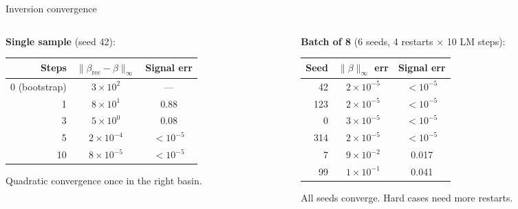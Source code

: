 \documentclass[aspectratio=169]{beamer}
\begin{document}
\begin{frame}{Inversion convergence}
  \begin{columns}[T]
    \begin{column}{0.52\textwidth}
      \textbf{Single sample} (seed 42):

      \smallskip

      \begin{tabular}{rcc}
        \toprule
        \textbf{Steps} & $\|\beta_{\text{rec}} - \beta\|_\infty$ & Signal err \\
        \midrule
        0 (bootstrap) & $3 \times 10^2$ & --- \\
        1 & $8 \times 10^1$ & 0.88 \\
        3 & $5 \times 10^0$ & 0.08 \\
        5 & $2 \times 10^{-4}$ & $< 10^{-5}$ \\
        10 & $8 \times 10^{-5}$ & $< 10^{-5}$ \\
        \bottomrule
      \end{tabular}

      \bigskip

      Quadratic convergence once in the right basin.
    \end{column}
    \begin{column}{0.46\textwidth}
      \textbf{Batch of 8} (6 seeds, 4 restarts $\times$ 10 LM steps):

      \smallskip

      \begin{tabular}{rcc}
        \toprule
        \textbf{Seed} & $\|\beta\|_\infty$ err & Signal err \\
        \midrule
        42  & $2 \times 10^{-5}$ & $< 10^{-5}$ \\
        123 & $2 \times 10^{-5}$ & $< 10^{-5}$ \\
        0   & $3 \times 10^{-5}$ & $< 10^{-5}$ \\
        314 & $2 \times 10^{-5}$ & $< 10^{-5}$ \\
        7   & $9 \times 10^{-2}$ & 0.017 \\
        99  & $1 \times 10^{-1}$ & 0.041 \\
        \bottomrule
      \end{tabular}

      \bigskip

      All seeds converge. Hard cases need more restarts.
    \end{column}
  \end{columns}
\end{frame}
\end{document}
